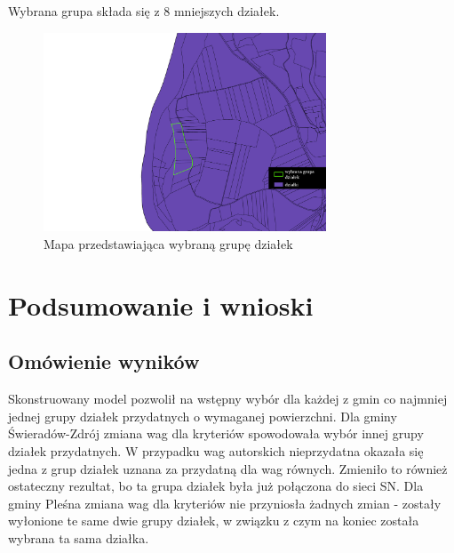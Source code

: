 \documentclass{article}
\begin{document}
Wybrana grupa składa się z 8 mniejszych działek.
\vspace{5pt}

\begin{figure}[H]
    \centering
    \includegraphics[width=0.75\textwidth]{img/plesna-wybrana-grupa-dzialek-iledzialek.jpg}
    \caption{Mapa przedstawiająca wybraną grupę działek}
\end{figure}

\section{Podsumowanie i wnioski}
\subsection{Omówienie wyników}
Skonstruowany model pozwolił na wstępny wybór dla każdej z gmin co najmniej jednej grupy działek przydatnych o wymaganej powierzchni. \newline 
Dla gminy Świeradów-Zdrój zmiana wag dla kryteriów spowodowała wybór innej grupy działek przydatnych. W przypadku wag autorskich nieprzydatna okazała się jedna z grup działek uznana za przydatną dla wag równych. Zmieniło to również ostateczny rezultat, bo ta grupa działek była już połączona do sieci SN. \newline
Dla gminy Pleśna zmiana wag dla kryteriów nie przyniosła żadnych zmian - zostały wyłonione te same dwie grupy działek, w związku z czym na koniec została wybrana ta sama działka.
\end{document}
